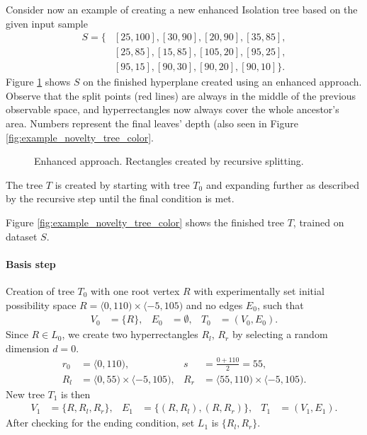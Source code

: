 \begin{example}
\label{example:novelty_tree_create}
Consider now an example of creating a new enhanced Isolation tree based on the given input sample
\begin{align*}
    S = \{&[25,100],[30,90],[20,90],[35,85],\\
    &[25,85],[15,85],[105,20],[95,25], \\
    &[95,15],[90,30],[90,20],[90,10]\}.
\end{align*}
Figure \ref{fig:example_novelty_gnu} shows $S$ on the finished hyperplane created using an enhanced approach. Observe that the split points (red lines) are always in the middle of the previous observable space, and hyperrectangles now always cover the whole ancestor's area. Numbers represent the final leaves' depth (also seen in Figure \ref{fig:example_novelty_tree_color}.

\begin{figure}[htbp]
\centering

\caption{Enhanced approach. Rectangles created by recursive splitting.}
\label{fig:example_novelty_gnu}
\end{figure}

 The tree $T$ is created by starting with tree $T_0$ and expanding further as described by the recursive step until the final condition is met.

Figure \ref{fig:example_novelty_tree_color} shows the finished tree $T$, trained on dataset $S$.


    \paragraph{Basis step} Creation of tree $T_0$ with one root vertex $R$ with experimentally set initial possibility space  $R= \langle 0,110) \times \langle -5,105)$ and no edges $E_0$, such that
    \begin{align*}
        V_0 &= \{R\},&
        E_0 &= \emptyset,&
        T_0 &= (V_0, E_0).
    \end{align*}
     Since $R \in L_0$, we create two hyperrectangles $R_l$, $R_r$ by selecting a random dimension $d=0$.
    \begin{align*}
        r_0 &= \langle 0, 110), &
        s &= \frac{0 + 110}{2} = 55, \\
        R_l &= \langle 0, 55) \times \langle -5,105), &
        R_r &= \langle 55, 110) \times \langle -5,105).
    \end{align*}
     New tree $T_1$ is then
    \begin{align*}
    V_1 &= \{R, R_l, R_r\}, &
    E_1 &= \{(R, R_l), (R, R_r)\}, &
    T_1 &= (V_1, E_1).
    \end{align*}
    After checking for the ending condition, set $L_1$ is $\{R_l, R_r\}$.


\end{example}
